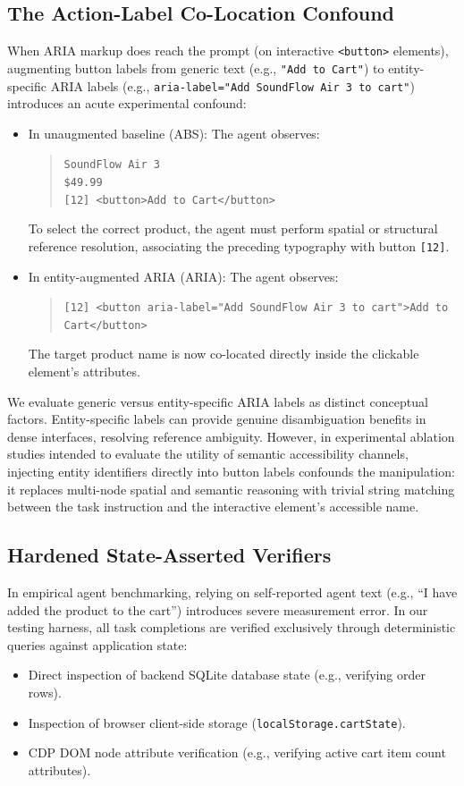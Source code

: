 \documentclass[11pt,a4paper]{article}
\begin{document}
\subsection{The Action-Label Co-Location Confound}
When ARIA markup does reach the prompt (on interactive \texttt{<button>} elements), augmenting button labels from generic text (e.g., \texttt{"Add to Cart"}) to entity-specific ARIA labels (e.g., \texttt{aria-label="Add SoundFlow Air 3 to cart"}) introduces an acute experimental confound:
\begin{itemize}
    \item In unaugmented baseline (\textsc{ABS}): The agent observes:
    \begin{quote}
    \texttt{SoundFlow Air 3} \\
    \texttt{\$49.99} \\
    \texttt{[12] <button>Add to Cart</button>}
    \end{quote}
    To select the correct product, the agent must perform spatial or structural reference resolution, associating the preceding typography with button \texttt{[12]}.
    \item In entity-augmented ARIA (\textsc{ARIA}): The agent observes:
    \begin{quote}
    \texttt{[12] <button aria-label="Add SoundFlow Air 3 to cart">Add to Cart</button>}
    \end{quote}
    The target product name is now co-located directly inside the clickable element's attributes.
\end{itemize}
We evaluate generic versus entity-specific ARIA labels as distinct conceptual factors. Entity-specific labels can provide genuine disambiguation benefits in dense interfaces, resolving reference ambiguity. However, in experimental ablation studies intended to evaluate the utility of semantic accessibility channels, injecting entity identifiers directly into button labels confounds the manipulation: it replaces multi-node spatial and semantic reasoning with trivial string matching between the task instruction and the interactive element's accessible name.

\subsection{Hardened State-Asserted Verifiers}
In empirical agent benchmarking, relying on self-reported agent text (e.g., ``I have added the product to the cart'') introduces severe measurement error. In our testing harness, all task completions are verified exclusively through deterministic queries against application state:
\begin{itemize}
    \item Direct inspection of backend SQLite database state (e.g., verifying order rows).
    \item Inspection of browser client-side storage (\texttt{localStorage.cartState}).
    \item CDP DOM node attribute verification (e.g., verifying active cart item count attributes).
\end{itemize}
\end{document}
